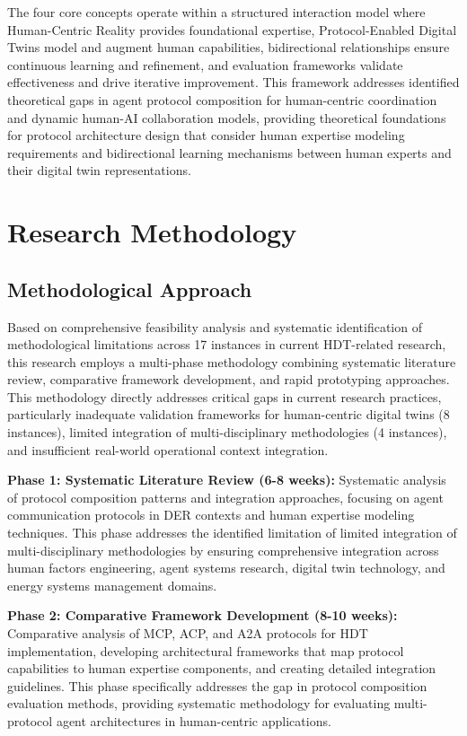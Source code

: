 \documentclass[12pt,a4paper]{article}
\begin{document}
The four core concepts operate within a structured interaction model where Human-Centric Reality provides foundational expertise, Protocol-Enabled Digital Twins model and augment human capabilities, bidirectional relationships ensure continuous learning and refinement, and evaluation frameworks validate effectiveness and drive iterative improvement. This framework addresses identified theoretical gaps in agent protocol composition for human-centric coordination and dynamic human-AI collaboration models, providing theoretical foundations for protocol architecture design that consider human expertise modeling requirements and bidirectional learning mechanisms between human experts and their digital twin representations.

\section{Research Methodology}
\label{sec:methodology}

\subsection{Methodological Approach}

Based on comprehensive feasibility analysis and systematic identification of methodological limitations across 17 instances in current HDT-related research, this research employs a multi-phase methodology combining systematic literature review, comparative framework development, and rapid prototyping approaches. This methodology directly addresses critical gaps in current research practices, particularly inadequate validation frameworks for human-centric digital twins (8 instances), limited integration of multi-disciplinary methodologies (4 instances), and insufficient real-world operational context integration.

\textbf{Phase 1: Systematic Literature Review (6-8 weeks):} Systematic analysis of protocol composition patterns and integration approaches, focusing on agent communication protocols in DER contexts and human expertise modeling techniques. This phase addresses the identified limitation of limited integration of multi-disciplinary methodologies by ensuring comprehensive integration across human factors engineering, agent systems research, digital twin technology, and energy systems management domains.

\textbf{Phase 2: Comparative Framework Development (8-10 weeks):} Comparative analysis of MCP, ACP, and A2A protocols for HDT implementation, developing architectural frameworks that map protocol capabilities to human expertise components, and creating detailed integration guidelines. This phase specifically addresses the gap in protocol composition evaluation methods, providing systematic methodology for evaluating multi-protocol agent architectures in human-centric applications.
\end{document}
